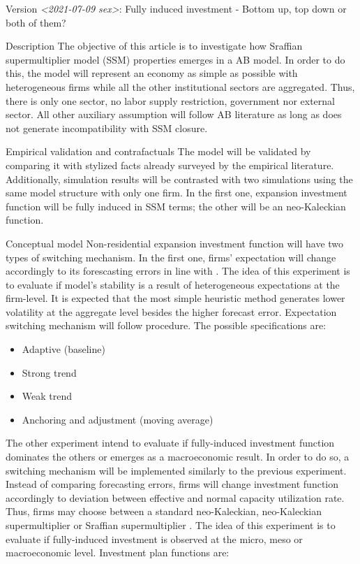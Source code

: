 \documentclass[presentation]{beamer}
\begin{document}
\begin{frame}[label={sec:org790494c}]{Version \textit{<2021-07-09 sex>}: Fully induced investment - Bottom up, top down or both of them?}
\begin{block}{Description}
The objective of this article is to investigate how Sraffian supermultiplier model (SSM) properties emerges in a AB model.
In order to do this, the model will represent an economy as simple as possible with heterogeneous firms while all the other institutional sectors are aggregated.
Thus, there is only one sector, no labor supply restriction, government nor external sector.
All other auxiliary assumption will follow AB literature as long as does not generate incompatibility with SSM closure.
\end{block}

\begin{block}{Empirical validation and contrafactuals}
The model will be validated by comparing it with stylized facts already surveyed by the empirical literature.
Additionally, simulation results will be contrasted with two simulations using the same model structure with only one firm.
In the first one, expansion investment function will be fully induced in SSM terms; the other will be an neo-Kaleckian function.
\end{block}

\begin{block}{Conceptual model}
Non-residential expansion investment function will have two types of switching mechanism.
In the first one, firms' expectation will change accordingly to its forescasting errors in line with \textcite{reissl_2021_Heterogeneousa,dosi_2020_RATIONAL}.
The idea of this experiment is to evaluate if model's stability is a result of heterogeneous expectations at the firm-level.
It is expected that the most simple heuristic method generates lower volatility at the aggregate level besides the higher forecast error.
Expectation switching mechanism will follow \cite{anufriev_2012_Evolutionary} procedure.
The possible specifications are:

\begin{itemize}
\item Adaptive (baseline)
\item Strong trend
\item Weak trend
\item Anchoring and adjustment (moving average)
\end{itemize}



The other experiment intend to evaluate if fully-induced investment function dominates the others or emerges as a macroeconomic result.
In order to do so, a switching mechanism will be implemented similarly to the previous experiment.
Instead of comparing forecasting errors, firms will change investment function accordingly to deviation between effective and normal capacity utilization rate.
Thus, firms may choose between a standard neo-Kaleckian, neo-Kaleckian supermultiplier \cite{allain_2015_Tacklinga} or Sraffian supermultiplier \cite{serrano_1995_Long}.
The idea of this experiment is to evaluate if fully-induced investment is observed at the micro, meso or macroeconomic level.
Investment plan functions are:


\end{block}
\end{frame}
\end{document}
